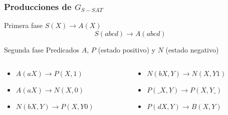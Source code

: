 \documentclass{beamer}
\begin{document}
\begin{frame}
    \frametitle{Producciones de $G_{S-SAT}$}

    \begin{block}{Primera fase}
        $S(X)\to A(X)$
        \pause
        $$S(abcd)\to A(abcd)$$
    \end{block}

    \pause
    \begin{block}{Segunda fase}
        Predicados $A$, $P$ (estado positivo) y $N$ (estado negativo)
        \begin{columns}
            \begin{column}{0.45\textwidth}
                \begin{itemize}
                    \item $A(aX)\to P(X,1)$
                          \pause
                    \item $A(aX)\to N(X,0)$
                          \pause
                    \item $N(bX,Y)\to P(X,Y0)$
                \end{itemize}
            \end{column}
            \pause
            \begin{column}{0.45\textwidth}
                \begin{itemize}
                    \item $N(bX,Y)\to N(X,Y1)$
                          \pause
                    \item $P(\_X,Y)\to P(X,Y\_)$
                          \pause
                    \item $P(dX,Y)\to B(X,Y)$
                \end{itemize}
            \end{column}
        \end{columns}

    \end{block}
\end{frame}
\end{document}
